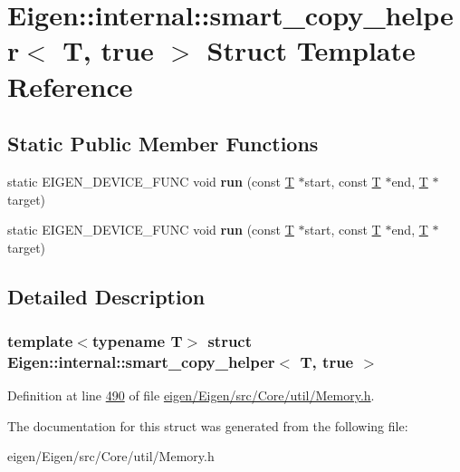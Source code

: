\hypertarget{struct_eigen_1_1internal_1_1smart__copy__helper_3_01_t_00_01true_01_4}{}\section{Eigen\+:\+:internal\+:\+:smart\+\_\+copy\+\_\+helper$<$ T, true $>$ Struct Template Reference}
\label{struct_eigen_1_1internal_1_1smart__copy__helper_3_01_t_00_01true_01_4}
\subsection*{Static Public Member Functions}
\begin{DoxyCompactItemize}
\item 
\mbox{\label{struct_eigen_1_1internal_1_1smart__copy__helper_3_01_t_00_01true_01_4_a9872c664be2ec0d7493901897b0e1adf}} 
static E\+I\+G\+E\+N\+\_\+\+D\+E\+V\+I\+C\+E\+\_\+\+F\+U\+NC void {\bfseries run} (const \hyperlink{group___sparse_core___module}{T} $\ast$start, const \hyperlink{group___sparse_core___module}{T} $\ast$end, \hyperlink{group___sparse_core___module}{T} $\ast$target)
\item 
\mbox{\label{struct_eigen_1_1internal_1_1smart__copy__helper_3_01_t_00_01true_01_4_a9872c664be2ec0d7493901897b0e1adf}} 
static E\+I\+G\+E\+N\+\_\+\+D\+E\+V\+I\+C\+E\+\_\+\+F\+U\+NC void {\bfseries run} (const \hyperlink{group___sparse_core___module}{T} $\ast$start, const \hyperlink{group___sparse_core___module}{T} $\ast$end, \hyperlink{group___sparse_core___module}{T} $\ast$target)
\end{DoxyCompactItemize}


\subsection{Detailed Description}
\subsubsection*{template$<$typename T$>$\newline
struct Eigen\+::internal\+::smart\+\_\+copy\+\_\+helper$<$ T, true $>$}



Definition at line \hyperlink{eigen_2_eigen_2src_2_core_2util_2_memory_8h_source_l00490}{490} of file \hyperlink{eigen_2_eigen_2src_2_core_2util_2_memory_8h_source}{eigen/\+Eigen/src/\+Core/util/\+Memory.\+h}.



The documentation for this struct was generated from the following file\+:\begin{DoxyCompactItemize}
\item 
eigen/\+Eigen/src/\+Core/util/\+Memory.\+h\end{DoxyCompactItemize}
